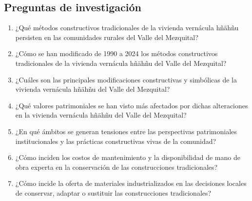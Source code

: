 \subsection{Preguntas de investigación}

\begin{enumerate}

	\item {¿Qué métodos constructivos tradicionales de la vivienda vernácula hñähñu persisten en las comunidades rurales del Valle del Mezquital?}

	\item {¿Cómo se han modificado de 1990 a 2024 los métodos constructivos tradicionales de la vivienda vernácula hñähñu del Valle del Mezquital?}

	\item {¿Cuáles son las principales modificaciones constructivas y simbólicas de la vivienda vernácula hñähñu del Valle del Mezquital?}

	\item {¿Qué valores patrimoniales se han visto más afectados por dichas alteraciones en la vivienda vernácula hñähñu del Valle del Mezquital?}

	\item{¿En qué ámbitos se generan tensiones entre las perspectivas patrimoniales institucionales y las prácticas constructivas vivas de la comunidad?}

	\item {¿Cómo inciden los costos de mantenimiento y la disponibilidad de mano de obra experta en la conservación de las construcciones tradicionales?}

	\item {¿Cómo incide la oferta de materiales industrializados en las decisiones locales de conservar, adaptar o sustituir las construcciones tradicionales?}

\end{enumerate}
